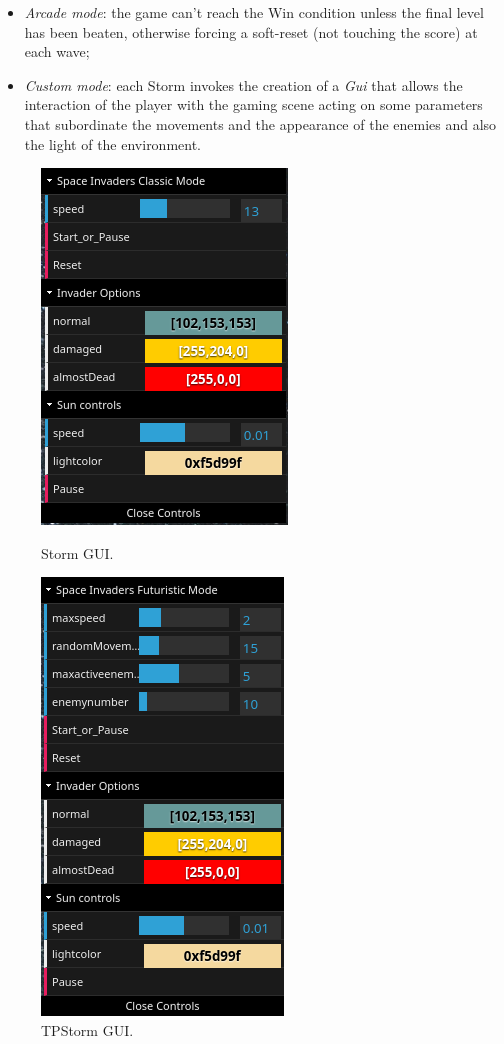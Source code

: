 \begin{itemize}
\item \textit{Arcade mode}: the game can't reach the Win condition unless the final level has been beaten, otherwise forcing a soft-reset (not touching the score) at each wave;
\item \textit{Custom mode}: each Storm invokes the creation of a \textit{Gui} that allows the interaction of the player with the gaming scene acting on some parameters that subordinate the movements and the appearance of the enemies and also the light of the environment.
\end{itemize}
\begin{figure}[!h]
   \begin{minipage}{0.50\textwidth}
     \centering
     \includegraphics[scale=0.28]{images/StormGui.png}
     \caption{\small Storm GUI.}
   \end{minipage}\hfill
   \begin{minipage}{0.50\textwidth}
     \centering
     \includegraphics[scale=0.28]{images/TPStormGui.png}
     \caption{\small TPStorm GUI.}
   \end{minipage}
\end{figure}
